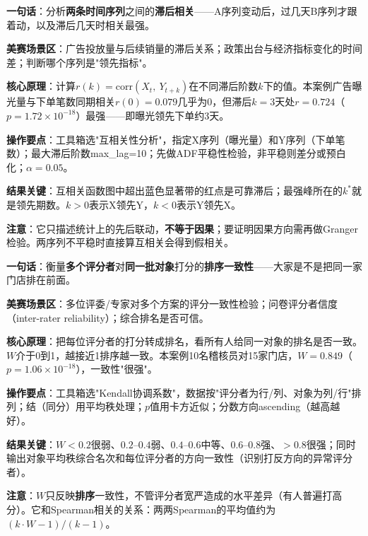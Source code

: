 
\begin{algobrief}
\textbf{一句话}：分析\textbf{两条时间序列}之间的\textbf{滞后相关}——A序列变动后，过几天B序列才跟着动，以及滞后几天时相关最强。

\textbf{美赛场景区}：广告投放量与后续销量的滞后关系；政策出台与经济指标变化的时间差；判断哪个序列是"领先指标"。

\textbf{核心原理}：计算$r(k)=\mathrm{corr}(X_t,\ Y_{t+k})$在不同滞后阶数$k$下的值。本案例广告曝光量与下单笔数同期相关$r(0)=0.079$几乎为0，但滞后$k=3$天处$r=0.724$（$p=1.72\times10^{-18}$）最强——即曝光领先下单约3天。

\textbf{操作要点}：工具箱选"互相关性分析"，指定X序列（曝光量）和Y序列（下单笔数）；最大滞后阶数max\_lag=10；先做ADF平稳性检验，非平稳则差分或预白化；$\alpha=0.05$。

\textbf{结果关键}：互相关函数图中超出蓝色显著带的红点是可靠滞后；最强峰所在的$k^*$就是领先期数。$k>0$表示X领先Y，$k<0$表示Y领先X。

\textbf{注意}：它只描述统计上的先后联动，\textbf{不等于因果}；要证明因果方向需再做Granger检验。两序列不平稳时直接算互相关会得到假相关。
\end{algobrief}


\begin{algobrief}
\textbf{一句话}：衡量\textbf{多个评分者}对\textbf{同一批对象}打分的\textbf{排序一致性}——大家是不是把同一家门店排在前面。

\textbf{美赛场景区}：多位评委/专家对多个方案的评分一致性检验；问卷评分者信度（inter-rater reliability）；综合排名是否可信。

\textbf{核心原理}：把每位评分者的打分转成排名，看所有人给同一对象的排名是否一致。$W$介于0到1，越接近1排序越一致。本案例10名稽核员对15家门店，$W=0.849$（$p=1.06\times10^{-18}$），一致性"很强"。

\textbf{操作要点}：工具箱选"Kendall协调系数"，数据按"评分者为行/列、对象为列/行"排列；结（同分）用平均秩处理；$p$值用卡方近似；分数方向ascending（越高越好）。

\textbf{结果关键}：$W<0.2$很弱、$0.2$--$0.4$弱、$0.4$--$0.6$中等、$0.6$--$0.8$强、$>0.8$很强；同时输出对象平均秩综合名次和每位评分者的方向一致性（识别打反方向的异常评分者）。

\textbf{注意}：$W$只反映\textbf{排序}一致性，不管评分者宽严造成的水平差异（有人普遍打高分）。它和Spearman相关的关系：两两Spearman的平均值约为$(k\cdot W-1)/(k-1)$。
\end{algobrief}
